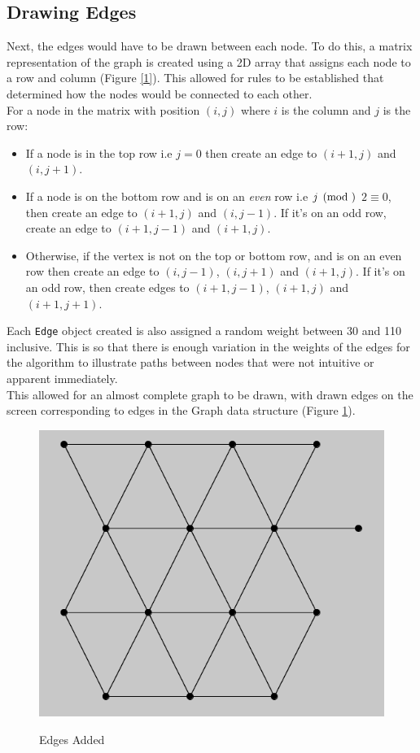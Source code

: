 \documentclass[11pt,a4paper]{article}
\begin{document}
\subsection*{Drawing Edges}

Next, the edges would have to be drawn between each node. To do this, a matrix representation of the graph 
is created using a 2D array that assigns each node to a row and column (Figure \ref{1}). This allowed for
rules to be established that determined how the nodes would be connected to each other.
\\
For a node in the matrix with position $(i,j)$ where $i$ is the column and $j$ is the row:
\begin{itemize}
	\item If a node is in the top row i.e $j = 0$ then create an edge to 
	$(i+1,j)$ and $(i,j+1)$.
	\item If a node is on the bottom row and is on an \emph{even} row  i.e $j \pmod $ $2 \equiv 0$,
	then create an edge to $(i+1,j)$ and $(i,j-1)$. If it's on an odd row, create an edge to $(i+1,j-1)$
	and $(i+1,j)$.
	\item Otherwise, if the vertex is not on the top or bottom row, and is on an even row then create an edge to
	$(i,j-1)$, $(i,j+1)$ and $(i+1,j)$. If it's on an odd row, then create edges to $(i+1,j-1)$, $(i+1,j)$ and $(i+1,j+1)$.
\end{itemize}
Each \texttt{Edge} object created is also assigned a random weight between 30 and 110 inclusive. This is so that
there is enough variation in the weights of the edges for the algorithm to illustrate paths between nodes that
were not intuitive or apparent immediately.
\\
This allowed for an almost complete graph to be drawn, with drawn edges on the screen corresponding to edges in
the Graph data structure (Figure \ref{2}).
\begin{figure}[h]
	\centering
	\caption{Edges Added}
	\vspace{10pt}
	\includegraphics[scale=0.5]{graph2.png}
	\label{2}
\end{figure}
\end{document}
